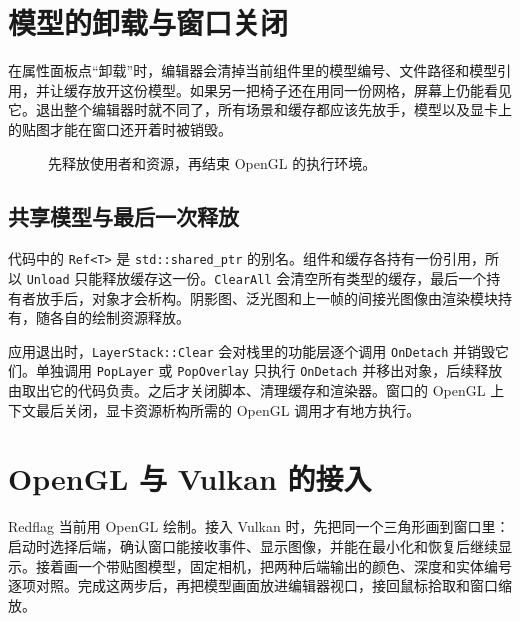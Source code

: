 \documentclass[UTF8,fontset=fandol,10pt,a4paper]{ctexart}
\newcommand{\code}[1]{{\small\texttt{#1}}}
\newcommand{\ruleline}{\par\vspace{-4pt}{\color{line}\hrule}\vspace{8pt}}
\begin{document}
\clearpage
\section{模型的卸载与窗口关闭}\ruleline
在属性面板点“卸载”时，编辑器会清掉当前组件里的模型编号、文件路径和模型引用，并让缓存放开这份模型。如果另一把椅子还在用同一份网格，屏幕上仍能看见它。退出整个编辑器时就不同了，所有场景和缓存都应该先放手，模型以及显卡上的贴图才能在窗口还开着时被销毁。

\begin{figure}[H]\centering
{}\caption{先释放使用者和资源，再结束 OpenGL 的执行环境。}\end{figure}
\subsection{共享模型与最后一次释放}
代码中的 \code{Ref<T>} 是 \code{std::shared\_ptr} 的别名。组件和缓存各持有一份引用，所以 \code{Unload} 只能释放缓存这一份。\code{ClearAll} 会清空所有类型的缓存，最后一个持有者放手后，对象才会析构。阴影图、泛光图和上一帧的间接光图像由渲染模块持有，随各自的绘制资源释放。

应用退出时，\code{LayerStack::Clear} 会对栈里的功能层逐个调用 \code{OnDetach} 并销毁它们。单独调用 \code{PopLayer} 或 \code{PopOverlay} 只执行 \code{OnDetach} 并移出对象，后续释放由取出它的代码负责。之后才关闭脚本、清理缓存和渲染器。窗口的 OpenGL 上下文最后关闭，显卡资源析构所需的 OpenGL 调用才有地方执行。

\clearpage
\section{OpenGL 与 Vulkan 的接入}\ruleline
Redflag 当前用 OpenGL 绘制。接入 Vulkan 时，先把同一个三角形画到窗口里：启动时选择后端，确认窗口能接收事件、显示图像，并能在最小化和恢复后继续显示。接着画一个带贴图模型，固定相机，把两种后端输出的颜色、深度和实体编号逐项对照。完成这两步后，再把模型画面放进编辑器视口，接回鼠标拾取和窗口缩放。
\end{document}
